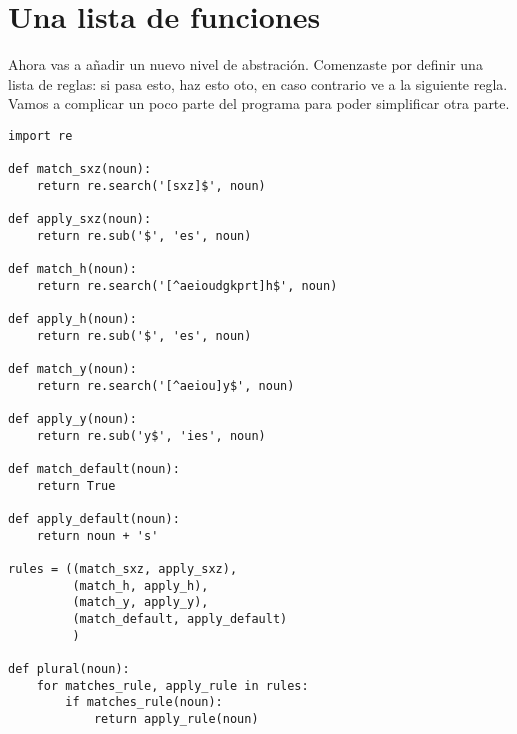 \section{Una lista de funciones}

Ahora vas a añadir un nuevo nivel de abstración. Comenzaste por definir una lista de reglas: si pasa esto, haz esto oto, en caso contrario ve a la siguiente regla. Vamos a complicar un poco parte del programa para poder simplificar otra parte.

\noindent\begin{minipage}{\textwidth}
\begin{lstlisting}[mathescape=False]
import re

def match_sxz(noun):
    return re.search('[sxz]$', noun)

def apply_sxz(noun):
    return re.sub('$', 'es', noun)

def match_h(noun):
    return re.search('[^aeioudgkprt]h$', noun)

def apply_h(noun):
    return re.sub('$', 'es', noun)

def match_y(noun):
    return re.search('[^aeiou]y$', noun)
        
def apply_y(noun):
    return re.sub('y$', 'ies', noun)

def match_default(noun):
    return True

def apply_default(noun):
    return noun + 's'

rules = ((match_sxz, apply_sxz),
         (match_h, apply_h),
         (match_y, apply_y),
         (match_default, apply_default)
         )

def plural(noun):           
    for matches_rule, apply_rule in rules:
        if matches_rule(noun):
            return apply_rule(noun)
\end{lstlisting}
\end{minipage}

